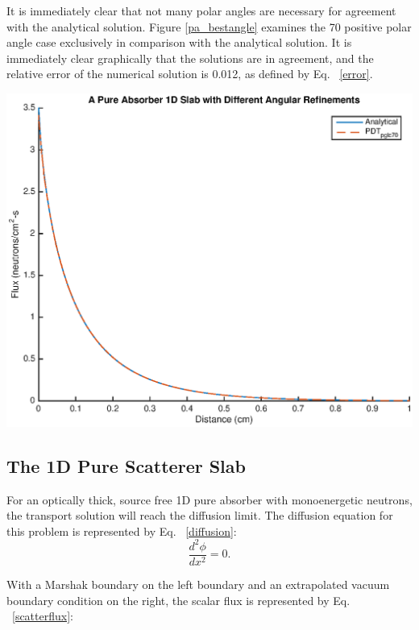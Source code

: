 It is immediately clear that not many polar angles are necessary for agreement with the analytical solution. Figure \ref{pa_bestangle} examines the 70 positive polar angle case exclusively in comparison with the analytical solution. It is immediately clear graphically that the solutions are in agreement, and the relative error of the numerical solution is 0.012, as defined by Eq. ~\eqref{error}.

\noindent\begin{minipage}{\textwidth}
\centering
\includegraphics[scale = 0.8]{figures/PureAbsorberBestangle.eps}
\label{pa_bestangle}
\end{minipage}
\smallskip

\subsection{The 1D Pure Scatterer Slab}

For an optically thick, source free 1D pure absorber with monoenergetic neutrons, the transport solution will reach the diffusion limit. The diffusion equation for this problem is represented by Eq. ~\eqref{diffusion}:
\begin{equation}
\frac{d^2\phi}{dx^2} = 0.
\label{diffusion}
\end{equation}

With a Marshak boundary on the left boundary and an extrapolated vacuum boundary condition on the right, the scalar flux is represented by Eq. ~\eqref{scatterflux}:

